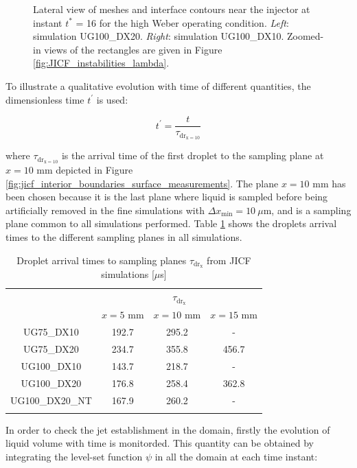 \begin{figure}[ht]
\centering
	\centering
\caption[Lateral view of meshes and interface contours near the injector at instant $t^{*}$ = 16 for the high Weber operating condition.]{Lateral view of meshes and interface contours near the injector at instant $t^{*}$ = 16 for the high Weber operating condition. \textsl{Left}: simulation UG100\_DX20. \textsl{Right}: simulation UG100\_DX10. Zoomed-in views of the rectangles are given in Figure \ref{fig:JICF_instabilities_lambda}.}
\label{fig:JICF_w_mesh}
\end{figure}

To illustrate a qualitative evolution with time of different quantities, the dimensionless time $t^{\prime} $ is used:

\begin{equation}
\label{eq:t_prime_with_tau_drx10}
t^{\prime} = \frac{t}{\tau_\mathrm{dr_{x=10}}}
\end{equation}

where $\tau_\mathrm{dr_{x=10}}$ is the arrival time of the first droplet to the sampling plane at $x = 10$ mm depicted in Figure \ref{fig:jicf_interior_boundaries_surface_measurements}. The plane $x = 10$ mm has been chosen because it is the last plane where liquid is sampled before being artificially removed in the fine simulations with $\Delta x_\mathrm{min} = 10 ~\mu$m, and is a sampling plane common to all simulations performed. Table \ref{tab:jicf_characteristic_droplet_sampling_times} shows the droplets arrival times to the different sampling planes in all simulations. 

\begin{table}[!h]
\centering
\caption{Droplet arrival times to sampling planes $\tau_\mathrm{dr_x}$ from JICF simulations [$\mu$s]}
\begin{tabular}{cccc}
\thickhline
\multirow{2}{*}{ \textbf{Case}} &  \multicolumn{3}{c}{$\tau_\mathrm{dr_x}$} \\
\cline{2-4}
 & $x = 5$ mm & $x = 10$ mm & $x = 15$ mm  \\
\thickhline 
UG75\_DX10  & 192.7 & 295.2 & -  \\
UG75\_DX20  & 234.7 & 355.8 & 456.7 \\
UG100\_DX10 & 143.7 & 218.7 & - \\
UG100\_DX20 & 176.8 & 258.4 & 362.8 \\
UG100\_DX20\_NT & 167.9 & 260.2 & - \\
\thickhline
\end{tabular}
\label{tab:jicf_characteristic_droplet_sampling_times}
\end{table}
In order to check the jet establishment in the domain, firstly the evolution of liquid volume with time is monitorded. This quantity can be obtained by integrating the level-set function $\psi$ in all the domain at each time instant:

